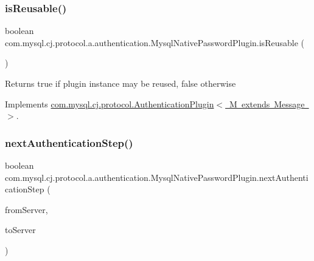 \subsubsection{\texorpdfstring{is\+Reusable()}{isReusable()}}
{\footnotesize\ttfamily boolean com.\+mysql.\+cj.\+protocol.\+a.\+authentication.\+Mysql\+Native\+Password\+Plugin.\+is\+Reusable (\begin{DoxyParamCaption}{ }\end{DoxyParamCaption})}

\begin{DoxyReturn}{Returns}
true if plugin instance may be reused, false otherwise 
\end{DoxyReturn}


Implements \mbox{\hyperlink{interfacecom_1_1mysql_1_1cj_1_1protocol_1_1_authentication_plugin_afff2eda7e67e6847d2401461100e2c69}{com.\+mysql.\+cj.\+protocol.\+Authentication\+Plugin$<$ M extends Message $>$}}.

\mbox{\label{classcom_1_1mysql_1_1cj_1_1protocol_1_1a_1_1authentication_1_1_mysql_native_password_plugin_a5ff368882987df231f558c6c160ad860}} 
\subsubsection{\texorpdfstring{next\+Authentication\+Step()}{nextAuthenticationStep()}}
{\footnotesize\ttfamily boolean com.\+mysql.\+cj.\+protocol.\+a.\+authentication.\+Mysql\+Native\+Password\+Plugin.\+next\+Authentication\+Step (\begin{DoxyParamCaption}\item[{\mbox{\hyperlink{classcom_1_1mysql_1_1cj_1_1protocol_1_1a_1_1_native_packet_payload}{Native\+Packet\+Payload}}}]{from\+Server,  }\item[{List$<$ \mbox{\hyperlink{classcom_1_1mysql_1_1cj_1_1protocol_1_1a_1_1_native_packet_payload}{Native\+Packet\+Payload}} $>$}]{to\+Server }\end{DoxyParamCaption})}

